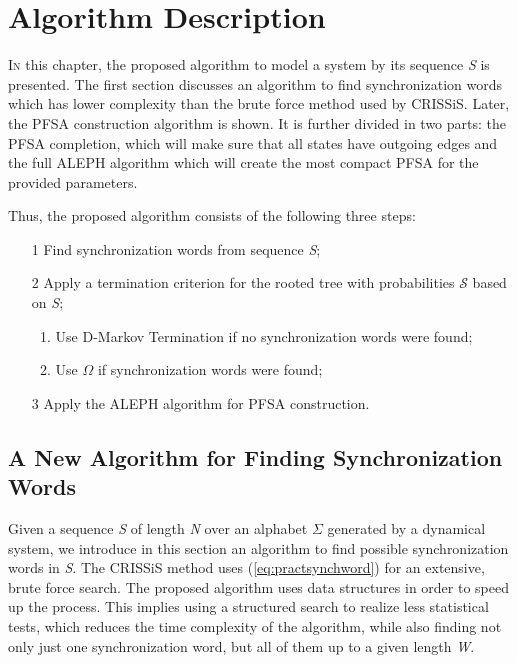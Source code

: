 \chapter{Algorithm Description}\label{cap:3}


{\lettrine[loversize=0.25,findent=0.2em,nindent=0em]{I}{n} this chapter, the proposed algorithm to model a system by its sequence \textit{S} is presented. The first section discusses an algorithm to find synchronization words which has lower complexity than the brute force method used by CRISSiS. Later, the PFSA construction algorithm is shown. It is further divided in two parts: the PFSA completion, which will make sure that all states have outgoing edges and the full ALEPH algorithm which will create the most compact PFSA for the provided parameters. 

Thus, the proposed algorithm consists of the following three steps: 


\begin{enumerate}
\item[1] Find synchronization words from sequence \textit{S};
\item[2] Apply a termination criterion for the rooted tree with probabilities $\mathcal{S}$ based on \textit{S};
	\begin{enumerate}
	\item Use D-Markov Termination if no synchronization words were found;
	\item Use $\Omega$ if synchronization words were found;
	\end{enumerate}
\item[3] Apply the ALEPH algorithm for PFSA construction.
\end{enumerate}

\section{A New Algorithm for Finding Synchronization Words}

Given a sequence \textit{S} of length \textit{N} over an alphabet $\Sigma$ generated by a dynamical system, we introduce in this section an algorithm to find possible synchronization words in \textit{S}. The CRISSiS method uses (\ref{eq:practsynchword}) for an extensive, brute force search.  The proposed algorithm uses data structures in order to speed up the process. This implies using a structured search to realize less statistical tests, which reduces the time complexity of the algorithm, while also finding not only just one synchronization word, but all of them up to a given length \textit{W}.

}
